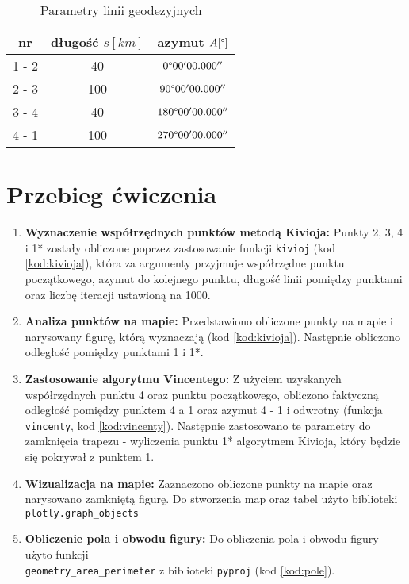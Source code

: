 \documentclass[fleqn,10pt,a4paper]{article}
\begin{document}
\begin{table}[!ht]
  \centering
    \begin{tabular}{|c|c|c|}
    \hline
    nr & długość $s[km]$ & azymut $A[\degree]$\\ \hline
    1 - 2 & 40 & $0\degree 00' 00.000''$ \\ \hline
    2 - 3 & 100 & $90\degree 00' 00.000''$ \\ \hline
    3 - 4 & 40 & $180\degree 00' 00.000''$ \\ \hline
    4 - 1 & 100 & $270\degree 00' 00.000''$ \\ \hline
    \end{tabular}
  \caption{Parametry linii geodezyjnych 
  \label{linie_geo}}
\end{table}

\newpage
\justify
\section{Przebieg ćwiczenia}

\begin{enumerate}
  \item \textbf{Wyznaczenie współrzędnych punktów metodą Kivioja:} Punkty 2, 3, 4 i 1* zostały obliczone
  poprzez zastosowanie funkcji \texttt{kivioj} (kod \ref{kod:kivioja}), która za argumenty przyjmuje współrzędne punktu początkowego,
  azymut do kolejnego punktu, długość linii pomiędzy punktami oraz liczbę iteracji ustawioną na 1000.
  \item \textbf{Analiza punktów na mapie:} Przedstawiono obliczone punkty na mapie i narysowany figurę,
  którą wyznaczają (kod \ref{kod:kivioja}). Następnie obliczono odległość pomiędzy punktami 1 i 1*.
  \item \textbf{Zastosowanie algorytmu Vincentego:} Z użyciem uzyskanych współrzędnych punktu 4 oraz punktu początkowego, 
  obliczono faktyczną odległość pomiędzy punktem 4 a 1 oraz azymut 4 - 1 i odwrotny (funkcja \texttt{vincenty}, kod \ref{kod:vincenty}). 
  Następnie zastosowano te parametry do zamknięcia trapezu - wyliczenia punktu 1* algorytmem Kivioja, który będzie się pokrywał z punktem 1.
  \item \textbf{Wizualizacja na mapie:} Zaznaczono obliczone punkty na mapie oraz narysowano zamkniętą figurę.
   Do stworzenia map oraz tabel użyto biblioteki \texttt{plotly.graph\_objects}
  \item \textbf{Obliczenie pola i obwodu figury:} Do obliczenia pola i obwodu figury użyto funkcji \\
  \texttt{geometry\_area\_perimeter} z biblioteki \texttt{pyproj} (kod \ref{kod:pole}).
\end{enumerate}
\end{document}
